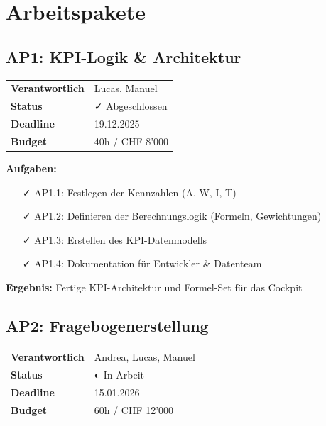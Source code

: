 \documentclass[11pt,a4paper]{article}
\begin{document}
\section{Arbeitspakete}

\subsection{AP1: KPI-Logik \& Architektur}

\begin{table}[h]
\centering
\begin{tabular}{L{4cm}L{8cm}}
\toprule
\textbf{Verantwortlich} & Lucas, Manuel \\
\textbf{Status} & \textcolor{fagreen}{✓ Abgeschlossen} \\
\textbf{Deadline} & 19.12.2025 \\
\textbf{Budget} & 40h / CHF 8'000 \\
\bottomrule
\end{tabular}
\end{table}

\textbf{Aufgaben:}
\begin{itemize}[leftmargin=*]
    \item[✓] AP1.1: Festlegen der Kennzahlen (A, W, I, T)
    \item[✓] AP1.2: Definieren der Berechnungslogik (Formeln, Gewichtungen)
    \item[✓] AP1.3: Erstellen des KPI-Datenmodells
    \item[✓] AP1.4: Dokumentation für Entwickler \& Datenteam
\end{itemize}

\textbf{Ergebnis:} Fertige KPI-Architektur und Formel-Set für das Cockpit

\subsection{AP2: Fragebogenerstellung}

\begin{table}[h]
\centering
\begin{tabular}{L{4cm}L{8cm}}
\toprule
\textbf{Verantwortlich} & Andrea, Lucas, Manuel \\
\textbf{Status} & \textcolor{faorange}{◐ In Arbeit} \\
\textbf{Deadline} & 15.01.2026 \\
\textbf{Budget} & 60h / CHF 12'000 \\
\bottomrule
\end{tabular}
\end{table}
\end{document}

